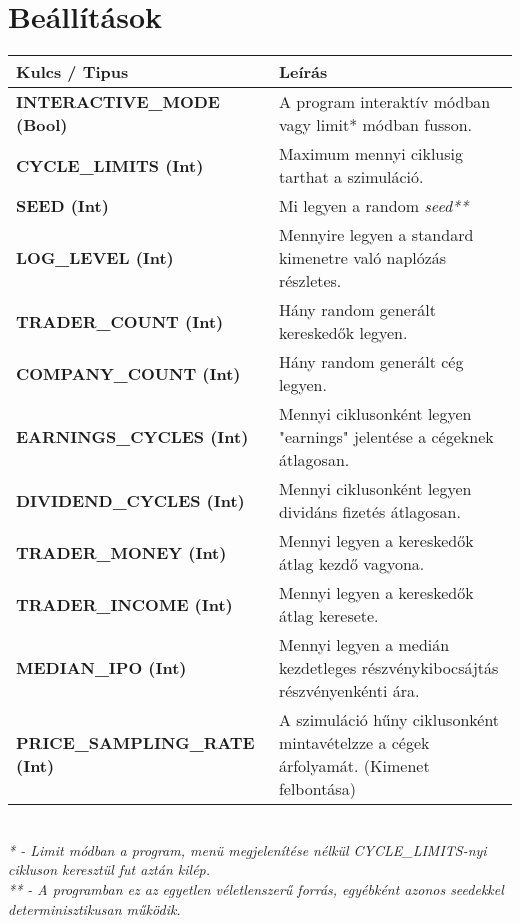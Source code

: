 \documentclass{article}[12pt,a4paper]
\begin{document}
    \section{Beállítások}
    \begin{center}
        \begin{tabular}{ | p{5.5cm} || p{5.5cm} | }
            \hline
            \textbf{Kulcs / Tipus}               & Leírás                                                                                \\
            \hline
            \textbf{INTERACTIVE\_MODE (Bool)}    & A program interaktív módban vagy limit* módban fusson.                                \\
            \hline
            \textbf{CYCLE\_LIMITS (Int)}         & Maximum mennyi ciklusig tarthat a szimuláció.                                         \\
            \hline
            \textbf{SEED (Int)}                  & Mi legyen a random \textit{seed**}                                                    \\
            \hline
            \textbf{LOG\_LEVEL (Int)}            & Mennyire legyen a standard kimenetre való naplózás részletes.                         \\
            \hline
            \textbf{TRADER\_COUNT (Int)}         & Hány random generált kereskedők legyen.                                               \\
            \hline
            \textbf{COMPANY\_COUNT (Int)}        & Hány random generált cég legyen.                                                      \\
            \hline
            \textbf{EARNINGS\_CYCLES (Int)}      & Mennyi ciklusonként legyen "earnings" jelentése a cégeknek átlagosan.                 \\
            \hline
            \textbf{DIVIDEND\_CYCLES (Int)}      & Mennyi ciklusonként legyen dividáns fizetés átlagosan.                                \\
            \hline
            \textbf{TRADER\_MONEY (Int)}         & Mennyi legyen a kereskedők átlag kezdő vagyona.                                       \\
            \hline
            \textbf{TRADER\_INCOME (Int)}        & Mennyi legyen a kereskedők átlag keresete.                                            \\
            \hline
            \textbf{MEDIAN\_IPO (Int)}           & Mennyi legyen a medián kezdetleges részvénykibocsájtás részvényenkénti ára.           \\
            \hline
            \textbf{PRICE\_SAMPLING\_RATE (Int)} & A szimuláció hűny ciklusonként mintavételzze a cégek árfolyamát. (Kimenet felbontása) \\
            \hline
        \end{tabular}\\
        \textit{* - Limit módban a program, menü megjelenítése nélkül CYCLE\_LIMITS-nyi cikluson keresztül fut aztán kilép.} \\
        \textit{** - A programban ez az egyetlen véletlenszerű forrás, egyébként azonos seedekkel determinisztikusan működik.}
    \end{center}
\end{document}
